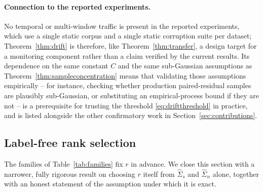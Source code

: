 \paragraph{Connection to the reported experiments.}
No temporal or multi-window traffic is present in the reported experiments,
which use a single static corpus and a single static corruption suite per
dataset; Theorem~\ref{thm:drift} is therefore, like Theorem~\ref{thm:transfer},
a design target for a monitoring component rather than a claim verified by
the current results. Its dependence on the same constant $C$ and the same
sub-Gaussian assumptions as Theorem~\ref{thm:sampleconcentration} means
that validating those assumptions empirically -- for instance, checking
whether production paired-residual samples are plausibly sub-Gaussian, or
substituting an empirical-process bound if they are not -- is a
prerequisite for trusting the threshold \cref{eq:driftthreshold} in
practice, and is listed alongside the other confirmatory work in
Section~\ref{sec:contributions}.

\subsection{Label-free rank selection}
\label{sec:rank-selection}

The families of Table~\ref{tab:families} fix $r$ in advance. We close this
section with a narrower, fully rigorous result on choosing $r$ itself from
$\widehat\Sigma_s$ and $\widehat\Sigma_n$ alone, together with an honest
statement of the assumption under which it is exact.

